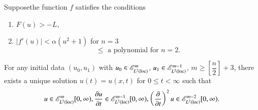 Suppose\pageoriginale the function $f$ satisfies the conditions  
\begin{enumerate}[(1)]
\item $F(u) > - L$,

\item $| f' (u) | < \alpha (u^2 + 1)$ for $n = 3$
$$
\leq \text{  a polynomial for } n = 2.
$$ 
\end{enumerate}

For any initial data $(u_0, u_1)$ with $u_0 \in
\mathscr{E}^m_{L^2 (\operatorname{loc})}$, $u_1 \in \mathscr{E}^{m -1}_{L^2
  (\operatorname{loc})}$, $m \geq [\dfrac{n}{2}] + 3$, there exists a unique solution
$u(t) = u (x, t)$ for $0 \leq t < \infty$ such that 
$$
u \in \mathscr{E}^m_{L^2 (\operatorname{loc})} [ 0, \infty), \frac{\partial
    u}{\partial t} \in \mathscr{E}^{m-1}_{L^2 (\operatorname{loc})} [ 0,
    \infty ), \left(\frac{\partial }{\partial t}\right)^2 u \in
    \mathscr{E}^{m-2}_{L^2 (\operatorname{loc})} [ 0, \infty ). 
$$

